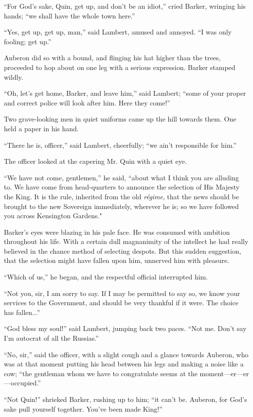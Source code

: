 \documentclass{book}
\begin{document}
“For God’s sake, Quin, get up, and don’t be an idiot,” cried Barker, wringing his hands; “we shall have the whole town here.”

“Yes, get up, get up, man,” said Lambert, amused and annoyed. “I was only fooling; get up.”

Auberon did so with a bound, and flinging his hat higher than the trees, proceeded to hop about on one leg with a serious expression. Barker stamped wildly.

“Oh, let’s get home, Barker, and leave him,” said Lambert; “some of your proper and correct police will look after him. Here they come!”

Two grave-looking men in quiet uniforms came up the hill towards them. One held a paper in his hand.

“There he is, officer,” said Lambert, cheerfully; “we ain’t responsible for him.”

The officer looked at the capering Mr. Quin with a quiet eye.

“We have not come, gentlemen,” he said, “about what I think you are alluding to. We have come from head-quarters to announce the selection of His Majesty the King. It is the rule, inherited from the old \emph{régime}, that the news should be brought to the new Sovereign immediately, wherever he is; so we have followed you across Kensington Gardens."

Barker’s eyes were blazing in his pale face. He was consumed with ambition throughout his life. With a certain dull magnanimity of the intellect he had really believed in the chance method of selecting despots. But this sudden suggestion, that the selection might have fallen upon him, unnerved him with pleasure.

“Which of us,” he began, and the respectful official interrupted him.

“Not you, sir, I am sorry to say. If I may be permitted to say so, we know your services to the Government, and should be very thankful if it were. The choice has fallen...”

“God bless my soul!” said Lambert, jumping back two paces. “Not me. Don’t say I’m autocrat of all the Russias.”

“No, sir,” said the officer, with a slight cough and a glance towards Auberon, who was at that moment putting his head between his legs and making a noise like a cow; “the gentleman whom we have to congratulate seems at the moment—er—er—occupied.”

“Not Quin!” shrieked Barker, rushing up to him; “it can’t be. Auberon, for God’s sake pull yourself together. You’ve been made King!”
\end{document}
